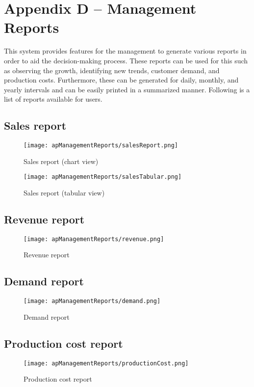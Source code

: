\documentclass[12pt]{report}
\begin{document}
\setcounter{chapter}{4}
\setcounter{section}{0}
\setcounter{figure}{0}
\chapter*{\Huge Appendix D – Management Reports}
This system provides features for the management to generate various reports in order to aid the decision-making process. These reports can be used for this such as observing the growth, identifying new trends, customer demand, and production costs. Furthermore, these can be generated for daily, monthly, and yearly intervals and can be easily printed in a summarized manner. Following is a list of reports available for users.

\section{Sales report}
\begin{figure}[H]
	\centering
	\texttt{[image: apManagementReports/salesReport.png]}
	\caption{Sales report (chart view)}
\end{figure}

\begin{figure}[H]
	\centering
	\texttt{[image: apManagementReports/salesTabular.png]}
	\caption{Sales report (tabular view)}
\end{figure}

\section{Revenue report}
\begin{figure}[H]
	\centering
	\texttt{[image: apManagementReports/revenue.png]}
	\caption{Revenue report}
\end{figure}

\section{Demand report}
\begin{figure}[H]
	\centering
	\texttt{[image: apManagementReports/demand.png]}
	\caption{Demand report}
\end{figure}

\section{Production cost report}
\begin{figure}[H]
	\centering
	\texttt{[image: apManagementReports/productionCost.png]}
	\caption{Production cost report}
\end{figure}
\end{document}
